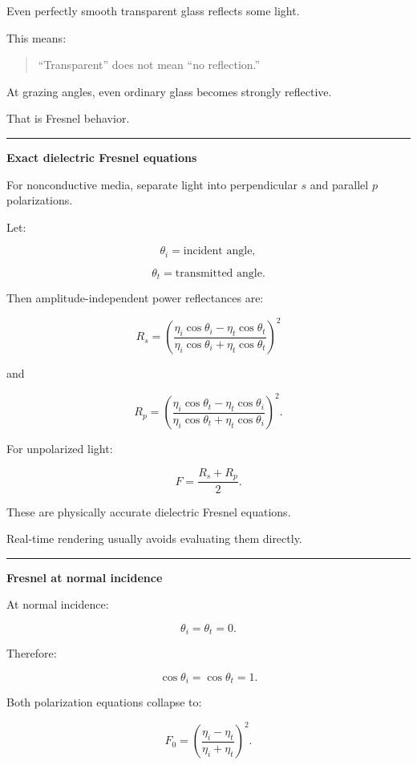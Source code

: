 Even perfectly smooth transparent glass reflects some light.

This means:

\begin{quote}
``Transparent'' does not mean ``no reflection.''
\end{quote}

At grazing angles, even ordinary glass becomes strongly reflective.

That is Fresnel behavior.

\begin{center}\rule{0.5\linewidth}{0.5pt}\end{center}

\textbf{Exact dielectric Fresnel equations}

For nonconductive media, separate light into perpendicular \(s\) and parallel \(p\) polarizations.

Let:

\[
\theta_i=\text{incident angle},
\]

\[
\theta_t=\text{transmitted angle}.
\]

Then amplitude-independent power reflectances are:

\[
\boxed{
R_s=
\left(
\frac{
\eta_i\cos\theta_i-\eta_t\cos\theta_t
}{
\eta_i\cos\theta_i+\eta_t\cos\theta_t
}
\right)^2
}
\]

and

\[
\boxed{
R_p=
\left(
\frac{
\eta_i\cos\theta_t-\eta_t\cos\theta_i
}{
\eta_i\cos\theta_t+\eta_t\cos\theta_i
}
\right)^2.
}
\]

For unpolarized light:

\[
\boxed{
F=
\frac{R_s+R_p}{2}.
}
\]

These are physically accurate dielectric Fresnel equations.

Real-time rendering usually avoids evaluating them directly.

\begin{center}\rule{0.5\linewidth}{0.5pt}\end{center}

\textbf{Fresnel at normal incidence}

At normal incidence:

\[
\theta_i=\theta_t=0.
\]

Therefore:

\[
\cos\theta_i=\cos\theta_t=1.
\]

Both polarization equations collapse to:

\[
\boxed{
F_0=
\left(
\frac{\eta_i-\eta_t}
{\eta_i+\eta_t}
\right)^2.
}
\]

